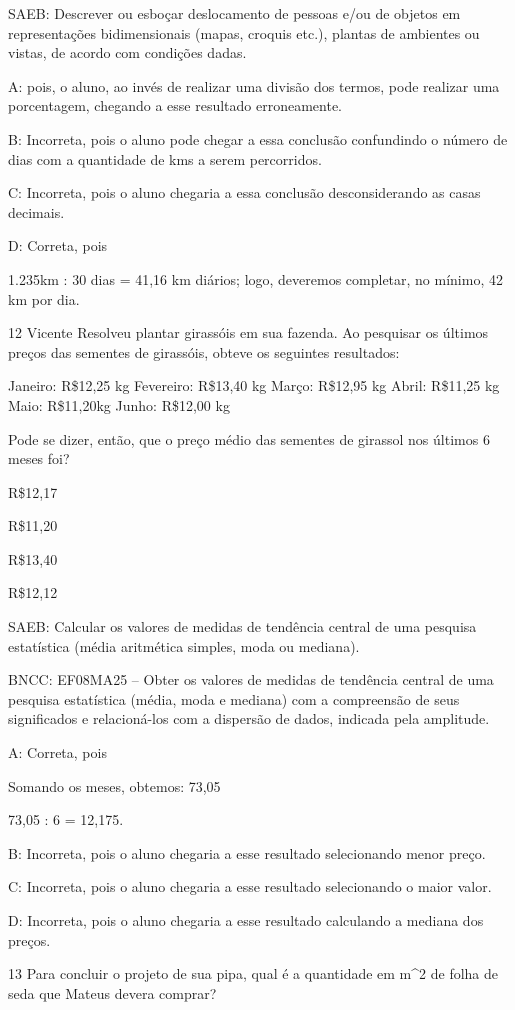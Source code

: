 {SAEB: Descrever ou esboçar deslocamento de pessoas e/ou de objetos em
representações bidimensionais (mapas, croquis etc.), plantas de
ambientes ou vistas, de acordo com condições dadas.

A: pois, o aluno, ao invés de realizar uma divisão dos termos, pode
realizar uma porcentagem, chegando a esse resultado erroneamente.

B: Incorreta, pois o aluno pode chegar a essa conclusão confundindo o
número de dias com a quantidade de kms a serem percorridos.

C: Incorreta, pois o aluno chegaria a essa conclusão desconsiderando as
casas decimais.

D: Correta, pois

1.235km : 30 dias = 41,16 km diários; logo, deveremos completar, no
mínimo, 42 km por dia.

\num{12} Vicente Resolveu plantar girassóis em sua fazenda. Ao pesquisar os
últimos preços das sementes de girassóis, obteve os seguintes
resultados:

Janeiro: R\$12,25 kg Fevereiro: R\$13,40 kg Março: R\$12,95 kg Abril:
R\$11,25 kg Maio: R\$11,20kg Junho: R\$12,00 kg

Pode se dizer, então, que o preço médio das sementes de girassol nos
últimos 6 meses foi?
\item R\$12,17
\item R\$11,20
\item R\$13,40
\item R\$12,12

SAEB: Calcular os valores de medidas de tendência central de uma
pesquisa estatística (média aritmética simples, moda ou mediana).

BNCC: EF08MA25 -- Obter os valores de medidas de tendência central de
uma pesquisa estatística (média, moda e mediana) com a compreensão de
seus significados e relacioná-los com a dispersão de dados, indicada
pela amplitude.

A: Correta, pois

Somando os meses, obtemos: 73,05

73,05 : 6 = 12,175.

B: Incorreta, pois o aluno chegaria a esse resultado selecionando menor
preço.

C: Incorreta, pois o aluno chegaria a esse resultado selecionando o
maior valor.

D: Incorreta, pois o aluno chegaria a esse resultado calculando a
mediana dos preços.

\num{13} Para concluir o projeto de sua pipa, qual é a quantidade em m^2 de
folha de seda que Mateus devera comprar?

}
